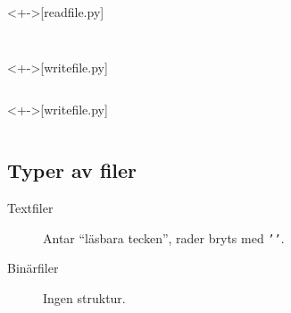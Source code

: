 \begin{frame}[fragile]
  \begin{example}<+->[read\textunderscore file.py]
    \inputminted[firstline=5,lastline=11,firstnumber=5,highlightlines={7-10}]{python}{examples/read_file.py}
  \end{example}

  \begin{example}
    \inputminted[firstline=16,lastline=20,firstnumber=5,highlightlines={7-8}]{python}{examples/read_file.py}
  \end{example}
\end{frame}

\begin{frame}[fragile]
  \begin{example}<+->[write\textunderscore file.py]
    \inputminted[firstline=5,lastline=9,firstnumber=5,highlightlines=8]{python}{examples/write_file.py}
  \end{example}

  \begin{example}<+->[write\textunderscore file.py]
    \inputminted[firstline=14,lastline=18,firstnumber=5,highlightlines=8]{python}{examples/write_file.py}
  \end{example}
\end{frame}

\subsection{Typer av filer}

\begin{frame}
  \begin{remark}
    \begin{description}
      \item[Textfiler] Antar \enquote{läsbara tecken}, rader bryts med 
        \texttt{'\n'}.
      \item[Binärfiler] Ingen struktur.
    \end{description}
  \end{remark}
\end{frame}

